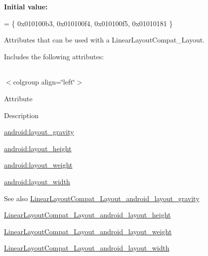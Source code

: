 {\bfseries Initial value\+:}
\begin{DoxyCode}
= \{
            0x010100b3, 0x010100f4, 0x010100f5, 0x01010181
        \}
\end{DoxyCode}
Attributes that can be used with a Linear\+Layout\+Compat\+\_\+\+Layout. 

Includes the following attributes\+:

\tabulinesep=1mm
\begin{longtabu} spread 0pt [c]{*{0}{|X[-1]}|}
\hline
\end{longtabu}
$<$colgroup align=\char`\"{}left\char`\"{}$>$ 

Attribute

Description 

{\ttfamily \hyperlink{classandroid_1_1support_1_1design_1_1R_1_1styleable_aeb6df2bd39cf9d81ebdbc42ed612ef49}{android\+:layout\+\_\+gravity}}

{\ttfamily \hyperlink{classandroid_1_1support_1_1design_1_1R_1_1styleable_a7ea65ac14f1c9d58597ba9d8152990ea}{android\+:layout\+\_\+height}}

{\ttfamily \hyperlink{classandroid_1_1support_1_1design_1_1R_1_1styleable_aed3b6a91c687106d85d4ca135edaf54f}{android\+:layout\+\_\+weight}}

{\ttfamily \hyperlink{classandroid_1_1support_1_1design_1_1R_1_1styleable_a027890dee732cd8c5007dc3a7c54674e}{android\+:layout\+\_\+width}}

\begin{DoxySeeAlso}{See also}
\hyperlink{classandroid_1_1support_1_1design_1_1R_1_1styleable_aeb6df2bd39cf9d81ebdbc42ed612ef49}{Linear\+Layout\+Compat\+\_\+\+Layout\+\_\+android\+\_\+layout\+\_\+gravity} 

\hyperlink{classandroid_1_1support_1_1design_1_1R_1_1styleable_a7ea65ac14f1c9d58597ba9d8152990ea}{Linear\+Layout\+Compat\+\_\+\+Layout\+\_\+android\+\_\+layout\+\_\+height} 

\hyperlink{classandroid_1_1support_1_1design_1_1R_1_1styleable_aed3b6a91c687106d85d4ca135edaf54f}{Linear\+Layout\+Compat\+\_\+\+Layout\+\_\+android\+\_\+layout\+\_\+weight} 

\hyperlink{classandroid_1_1support_1_1design_1_1R_1_1styleable_a027890dee732cd8c5007dc3a7c54674e}{Linear\+Layout\+Compat\+\_\+\+Layout\+\_\+android\+\_\+layout\+\_\+width} 
\end{DoxySeeAlso}
\mbox{\label{classandroid_1_1support_1_1design_1_1R_1_1styleable_aeb6df2bd39cf9d81ebdbc42ed612ef49}} 
